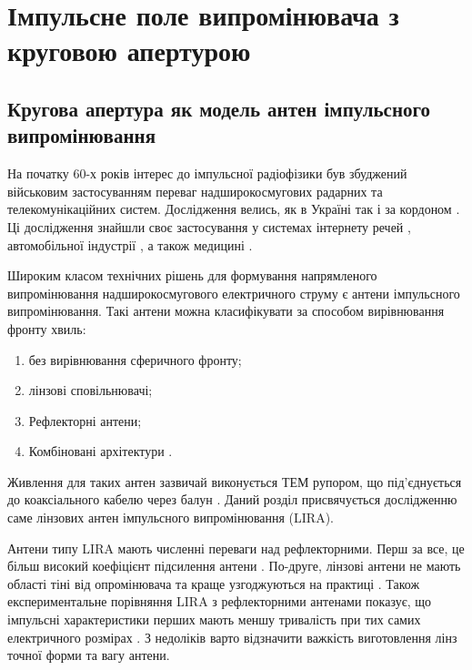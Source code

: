 \chapter{Імпульсне поле випромінювача з круговою апертурою}
\label{ch:linear}

\section{Кругова апертура як модель антен імпульсного випромінювання}

На початку 60-х років інтерес до імпульсної радіофізики був збуджений
військовим застосуванням переваг надширокосмугових радарних та 
телекомунікаційних систем. Дослідження велись, як в Україні 
\cite{imp:Dumin1996} так і за кордоном \cite{imp:BaumIN0105}. Ці дослідження
знайшли своє застосування у системах інтернету речей \cite{imp:Hartmann2015}, 
автомобільної індустрії \cite{imp:Yarovoy2017}, а також медицині 
\cite{imp:Cho2016}.

Широким класом технічних рішень для формування напрямленого випромінювання 
надширокосмугового електричного струму є антени імпульсного випромінювання.
Такі антени можна класифікувати за способом вирівнювання фронту хвиль:
%
\begin{enumerate}
	\item без вирівнювання сферичного фронту;
	\item лінзові сповільнювачі;
	\item Рефлекторні антени;
	\item Комбіновані архітектури \cite{imp:BaumSSN0379}.
\end{enumerate}

Живлення для таких антен зазвичай виконується ТЕМ рупором, що під'єднується 
до коаксіального кабелю через балун \cite{imp:BaumSSN0357}. Даний розділ 
присвячується дослідженню саме лінзових антен імпульсного випромінювання (LIRA). 

Антени типу LIRA мають численні переваги над рефлекторними. Перш за все, це
більш високий коефіцієнт підсилення антени \cite{imp:BaumUWBSP1}. По-друге,
лінзові антени не мають області тіні від опромінювача та краще узгоджуються
на практиці \cite{imp:BaumSSN0377}. Також експериментальне порівняння LIRA 
з рефлекторними антенами показує, що імпульсні характеристики перших мають 
меншу тривалість при тих самих електричного розмірах \cite{imp:BaumSSN0377}.
З недоліків варто відзначити важкість виготовлення лінз точної форми та 
вагу антени.

